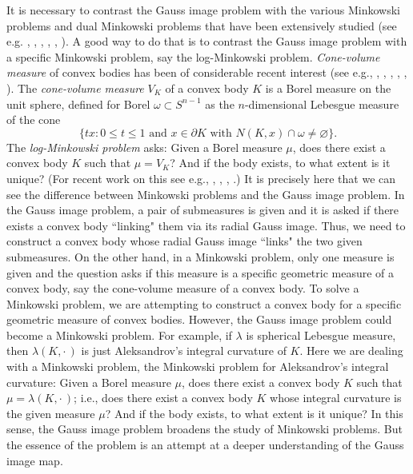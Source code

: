 \documentclass{cpamart1}     %
\theoremstyle{definition}
\theoremstyle{remark}
\newcommand{\sn}{S^{n-1}}
\begin{document}
It is necessary to contrast the Gauss image problem with the various Minkowski problems
and dual Minkowski problems that have been extensively studied (see e.g.
 \cite{BHP17jdg, BLYZ13jams, ChengYau, CW06adv}, \cite{HLYZ16,HLYZ16p,HZ18adv},
 \cite{L93jdg, LO95jdg, LYZ00jdg, LYZ04tams, LYZ06imrn, LYZ16}, 
 \cite{Ol2,Ol21,Ol}, \cite{Sta1}, \cite{YZCVPDE, YZJDG, Zu, Zu2}). A good way to do that is to contrast
 the Gauss image problem with a specific Minkowski problem, say the log-Minkowski
  problem. {\it Cone-volume measure} of convex bodies has been of considerable
   recent interest (see e.g., \cite{ BGMN05annprob, BH16adv, BH17adv,  BLYZ13jams},
   \cite{HL14adv}, \cite{HP18adv}, \cite{N07tams}, \cite{NR03aihpps}, \cite{Sta1}). The {\it cone-volume measure}
   $V_K$ of a convex body $K$ is a Borel measure on the unit sphere, defined for
    Borel $\omega\subset\sn$ as the $n$-dimensional Lebesgue measure of the cone
\begin{equation*}
\{tx: \text{$0\le t\le 1$  and $x\in\partial K$ with $N(K,x)\cap\omega\neq\varnothing$}\}.
\end{equation*}
The {\it log-Minkowski problem} asks: Given a Borel measure $\mu$, does there exist
 a convex body $K$ such that $\mu=V_K$? And if the body exists, to what extent is it unique?
 (For recent work on this see e.g., \cite{And96jdg, And99inv, And03jams}, \cite{BLYZ13jams},
 \cite{HL14adv}, \cite{HP18adv}.) It is precisely here that we can see the difference between Minkowski
 problems and the Gauss image problem. In the Gauss image problem, a pair of submeasures
 is given and it is asked if there exists a convex body ``linking" them
via its radial Gauss image.
Thus, we need to construct a convex body
whose radial Gauss image
``links" the two given submeasures.
On the other hand, in a Minkowski problem, only one measure
is given and the question asks if this measure is a specific geometric measure of a convex body, say the cone-volume
 measure of a convex body. To solve a Minkowski problem, we are attempting to construct
 a convex body for a specific geometric measure of convex bodies. However, the Gauss
 image problem could become a Minkowski problem. For example, if $\lambda$ is spherical
  Lebesgue measure, then $\lambda(K,\cdot\,)$ is just Aleksandrov's integral curvature of $K$.
  Here we are dealing with a Minkowski problem, the Minkowski problem for Aleksandrov's
   integral curvature: Given a Borel measure $\mu$, does there exist a convex body $K$
   such that $\mu=\lambda(K,\cdot\,)$; i.e., does there exist a convex body $K$ whose
   integral curvature is the given measure $\mu$? And if the body exists, to what extent is it unique?
In this sense, the Gauss image problem broadens the study of Minkowski problems. But the essence
of the problem is an attempt at a deeper understanding of the Gauss image map.
\medskip
\end{document}

